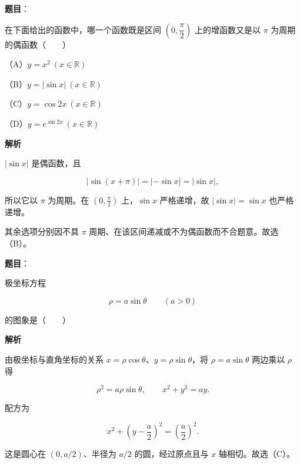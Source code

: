 \begin{answer}

\textbf{题目}：

在下面给出的函数中，哪一个函数既是区间 $\left(0,\dfrac\pi2\right)$ 上的增函数又是以 $\pi$ 为周期的偶函数\mbox{（　　）}

（A）$y=x^2\ (x\in\mathbb R)$

（B）$y=|\sin x|\ (x\in\mathbb R)$

（C）$y=\cos2x\ (x\in\mathbb R)$

（D）$y=e^{\sin2x}\ (x\in\mathbb R)$

\textbf{解析}

$|\sin x|$ 是偶函数，且

\nopagebreak[4]
\[
|\sin(x+\pi)|=|-\sin x|=|\sin x|,
\]

所以它以 $\pi$ 为周期。在 $\left(0,\frac\pi2\right)$ 上，$\sin x$ 严格递增，故 $|\sin x|=\sin x$ 也严格递增。

其余选项分别因不具 $\pi$ 周期、在该区间递减或不为偶函数而不合题意。故选（B）。


\end{answer}
\begin{answer}

\textbf{题目}：

极坐标方程

\nopagebreak[4]
\[
\rho=a\sin\theta\qquad(a>0)
\]

的图象是\mbox{（　　）}
\nopagebreak[4]
\begin{center}\end{center}
\nopagebreak[4]
\textbf{解析}

由极坐标与直角坐标的关系 $x=\rho\cos\theta$、$y=\rho\sin\theta$，将
$\rho=a\sin\theta$ 两边乘以 $\rho$ 得

\nopagebreak[4]
\[
\rho^2=a\rho\sin\theta,
\qquad
x^2+y^2=ay.
\]

配方为

\nopagebreak[4]
\[
x^2+\left(y-\frac a2\right)^2=\left(\frac a2\right)^2.
\]

这是圆心在 $(0,a/2)$、半径为 $a/2$ 的圆，经过原点且与 $x$ 轴相切。故选（C）。


\end{answer}
